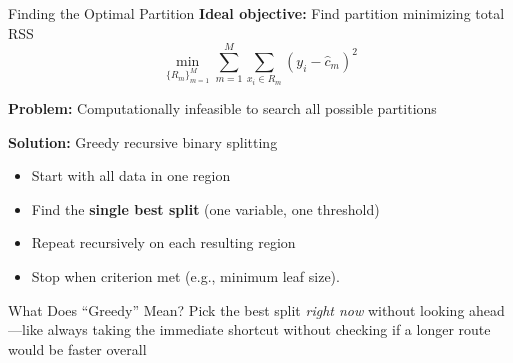\documentclass[10pt]{beamer}
\newcommand{\highlight}[1]{\textcolor{AccentOrange}{\textbf{#1}}}
\begin{document}

\begin{frame}{Finding the Optimal Partition}
  \textbf{Ideal objective:} Find partition minimizing total RSS
  \[
  \min_{\{R_m\}_{m=1}^{M}} \sum_{m=1}^{M} \sum_{x_i \in R_m} (y_i - \widehat{c}_m)^2
  \]

  \vspace{0.5em}
  \textbf{Problem:} Computationally infeasible to search all possible partitions

  \vspace{1em}
  \textbf{Solution:} Greedy recursive binary splitting
  \begin{itemize}
    \item Start with all data in one region
    \item Find the \highlight{single best split} (one variable, one threshold)
    \item Repeat recursively on each resulting region
    \item Stop when criterion met (e.g., minimum leaf size).
  \end{itemize}

  \vspace{0.5em}
  \begin{block}{What Does ``Greedy'' Mean?}
    Pick the best split \textit{right now} without looking ahead---like always taking the immediate shortcut without checking if a longer route would be faster overall
  \end{block}
\end{frame}


\end{document}
